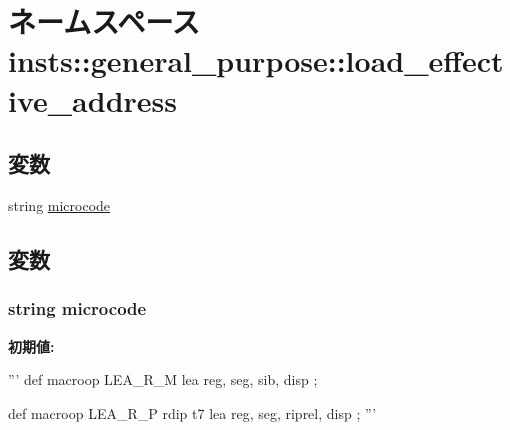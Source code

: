 \hypertarget{namespaceinsts_1_1general__purpose_1_1load__effective__address}{
\section{ネームスペース insts::general\_\-purpose::load\_\-effective\_\-address}
\label{namespaceinsts_1_1general__purpose_1_1load__effective__address}
}
\subsection*{変数}
\begin{DoxyCompactItemize}
\item 
string \hyperlink{namespaceinsts_1_1general__purpose_1_1load__effective__address_a770f11a173e99389a8802f0107ed8f52}{microcode}
\end{DoxyCompactItemize}


\subsection{変数}
\hypertarget{namespaceinsts_1_1general__purpose_1_1load__effective__address_a770f11a173e99389a8802f0107ed8f52}{
\subsubsection[{microcode}]{\setlength{\rightskip}{0pt plus 5cm}string {\bf microcode}}}
\label{namespaceinsts_1_1general__purpose_1_1load__effective__address_a770f11a173e99389a8802f0107ed8f52}
{\bfseries 初期値:}
\begin{DoxyCode}
'''
def macroop LEA_R_M {
    lea reg, seg, sib, disp
};

def macroop LEA_R_P {
    rdip t7
    lea reg, seg, riprel, disp
};
'''
\end{DoxyCode}
